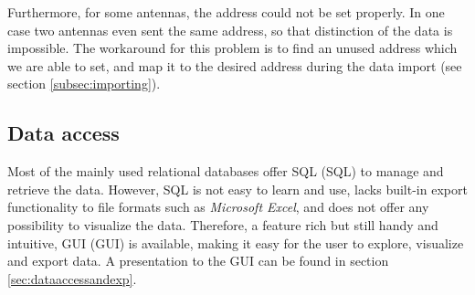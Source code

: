 Furthermore, for some antennas, the address could not be set properly. In one case two antennas even sent the same address, so that distinction of the data is impossible. The workaround for this problem is to find an unused address which we are able to set, and map it to the desired address during the data import (see section \ref{subsec:importing}).   

\subsection{Data access}
\label{subsec:dataccess}

Most of the mainly used relational databases offer \ac{SQL} (SQL) to manage and retrieve the data. However, SQL is not easy to learn and use, lacks built-in export functionality to file formats such as \textit{Microsoft Excel}, and does not offer any possibility to visualize the data. Therefore, a feature rich but still handy and intuitive, \acf{GUI} (GUI) is available, making it easy for the user to explore, visualize and export data. A presentation to the GUI can be found in section \ref{sec:dataaccessandexp}.